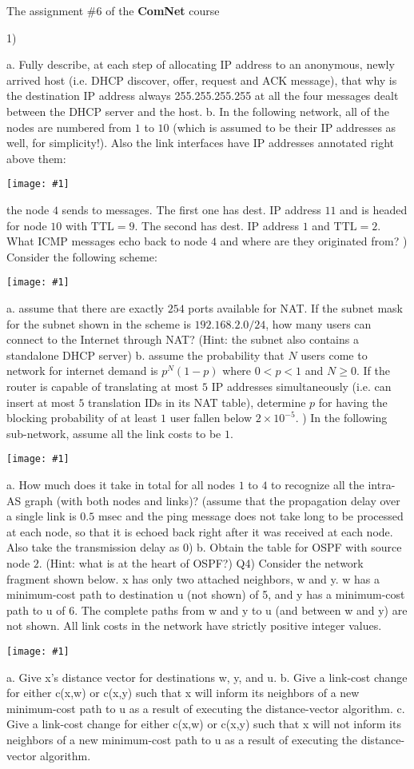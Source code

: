 \documentclass[10pt,letterpaper]{article}
\newcommand{\nl}{\newline\newline}
\newcommand{\pic}[1]{
\begin{center}
\texttt{[image: \#1]}
\end{center}
}
\begin{document}
\Large
\begin{center}
The assignment \#6 of the \textbf{ComNet} course
\end{center}
1) 

a. Fully describe, at each step of allocating IP address to an anonymous, newly arrived host (i.e. DHCP discover, offer, request and ACK message), that why is the destination IP address always 255.255.255.255 at all the four  messages dealt between the DHCP server and the host.
\nl
b. In the following network, all of the nodes are numbered from $1$ to $10$ (which is assumed to be their IP addresses as well, for simplicity!). Also the link interfaces have IP addresses annotated right above them:
\pic{Q1_B_HW6.pdf}
the node $4$ sends to messages. The first one has dest. IP address $11$ and is headed for node $10$ with $\text{TTL}=9$. The second has dest. IP address $1$ and $\text{TTL}=2$. What ICMP messages echo back to node $4$ and where are they originated from?
\nl
2) Consider the following scheme:
\pic{Q2_HW6.pdf}
a. assume that there are exactly $254$ ports available for NAT. If the subnet mask for the subnet shown in the scheme is $192.168.2.0/24$, how many users can connect to the Internet through NAT? (Hint: the subnet also contains a standalone DHCP server)
\nl
b. assume the probability that $N$ users come to network for internet demand is $p^N(1-p)$ where $0<p<1$ and $N\ge 0$. If the router is capable of translating at most $5$ IP addresses simultaneously (i.e. can insert at most $5$ translation IDs in its NAT table), determine $p$ for having the blocking probability of at least $1$ user fallen below $2\times 10^{-5}$.
\nl
3) In the following sub-network, assume all the link costs to be $1$.
\pic{Q3_HW6.pdf}
a. How much does it take in total for all nodes $1$ to $4$ to recognize all the intra-AS graph (with both nodes and links)? (assume that the propagation delay over a single link is $0.5$ msec and the ping message does not take long to be processed at each node, so that it is echoed back right after it was received at each node. Also take the transmission delay as $0$)
\nl
b. Obtain the table for OSPF with source node $2$. (Hint: what is at the heart of OSPF?)
\nl
Q4)
Consider the network fragment shown below. x has only two attached neighbors, w and y. w has a minimum-cost path to destination u (not shown) of 5, and y has a minimum-cost path to u of 6. The complete paths from w and y to u (and between w and y) are not shown. All link costs in the network have strictly positive integer values.
\pic{Q4_HW6.pdf}
a. Give x's distance vector for destinations w, y, and u.
\nl
b. Give a link-cost change for either c(x,w) or c(x,y) such that x will inform its neighbors of a new minimum-cost path to u as a result of executing the distance-vector algorithm.
\nl
c. Give a link-cost change for either c(x,w) or c(x,y) such that x will not inform its neighbors of a new minimum-cost path to u as a result of executing the distance-vector algorithm.
\end{document}
